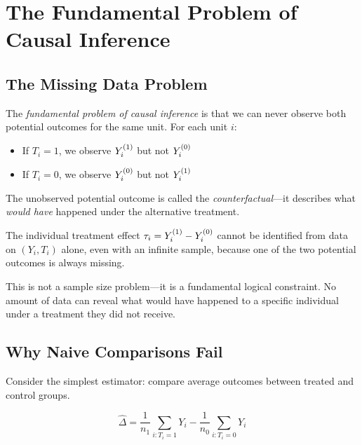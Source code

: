\section{The Fundamental Problem of Causal Inference}
\label{sec:fundamental_problem}

\subsection{The Missing Data Problem}

The \emph{fundamental problem of causal inference} \cite{holland1986statistics} is that we can never observe both potential outcomes for the same unit. For each unit $i$:
\begin{itemize}
    \item If $T_i = 1$, we observe $Y^{(1)}_i$ but not $Y^{(0)}_i$
    \item If $T_i = 0$, we observe $Y^{(0)}_i$ but not $Y^{(1)}_i$
\end{itemize}

The unobserved potential outcome is called the \emph{counterfactual}---it describes what \emph{would have} happened under the alternative treatment.

\begin{proposition}
\label{prop:ite_unidentified}
The individual treatment effect $\tau_i = Y^{(1)}_i - Y^{(0)}_i$ cannot be identified from data on $(Y_i, T_i)$ alone, even with an infinite sample, because one of the two potential outcomes is always missing.
\end{proposition}

This is not a sample size problem---it is a fundamental logical constraint. No amount of data can reveal what would have happened to a specific individual under a treatment they did not receive.

\subsection{Why Naive Comparisons Fail}

Consider the simplest estimator: compare average outcomes between treated and control groups.

\begin{equation}
\hat{\Delta} = \frac{1}{n_1} \sum_{i: T_i = 1} Y_i - \frac{1}{n_0} \sum_{i: T_i = 0} Y_i
\label{eq:naive_comparison}
\end{equation}

